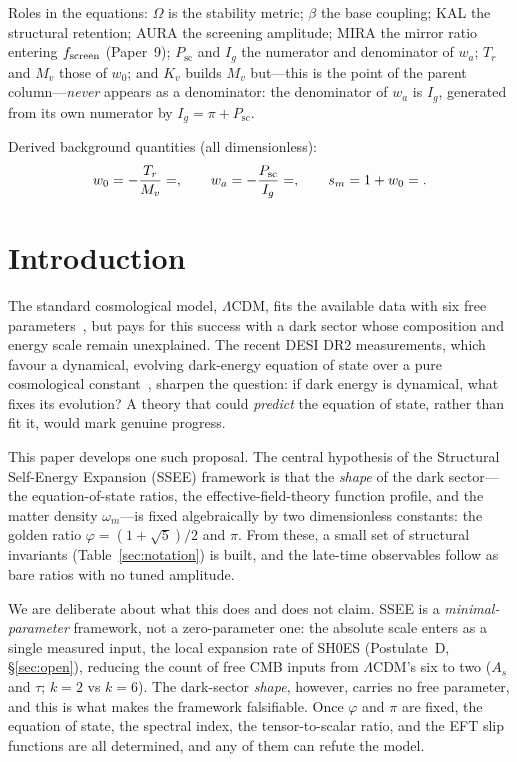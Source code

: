 \documentclass[a4paper,11pt]{article}
\begin{document}
\noindent Roles in the equations: $\Omega$ is the stability metric; $\beta$ the
base coupling; KAL the structural retention; AURA the screening amplitude; MIRA
the mirror ratio entering $f_{\rm screen}$ (Paper~9); $P_{\mathrm{sc}}$ and $I_g$
the numerator and denominator of $w_a$; $T_r$ and $M_v$ those of $w_0$; and $K_v$
builds $M_v$ but---this is the point of the parent column---\emph{never} appears
as a denominator: the denominator of $w_a$ is $I_g$, generated from its own
numerator by $I_g=\pi+P_{\mathrm{sc}}$.

\noindent Derived background quantities (all dimensionless):
\begin{equation*}
w_0=-\frac{T_r}{M_v}=\val{W0_d6},\qquad
w_a=-\frac{P_{\mathrm{sc}}}{I_g}=\val{WA_d6},\qquad
s_m=1+w_0=\val{S_M_d6} .
\end{equation*}


\section{Introduction}
\label{sec:intro}

The standard cosmological model, $\Lambda$CDM, fits the available data with six
free parameters~\citep{Planck2018}, but pays for this success with a dark sector whose composition
and energy scale remain unexplained. The recent DESI DR2 measurements, which
favour a dynamical, evolving dark-energy equation of state over a pure
cosmological constant~\citep{AbdulKarim2025}, sharpen the question: if dark
energy is dynamical, what fixes its evolution? A theory that could
\emph{predict} the equation of state, rather than fit it, would mark genuine
progress.

This paper develops one such proposal. The central hypothesis of the
Structural Self-Energy Expansion (SSEE) framework is that the \emph{shape} of
the dark sector---the equation-of-state ratios, the effective-field-theory function profile, and the matter density $\omega_m$---is fixed algebraically by two dimensionless constants: the golden
ratio $\varphi=(1+\sqrt5)/2$ and $\pi$. From these, a small set of structural
invariants (Table~\ref{sec:notation}) is built, and the late-time observables
follow as bare ratios with no tuned amplitude.

We are deliberate about what this does and does not claim. SSEE is a
\emph{minimal-parameter} framework, not a zero-parameter one: the absolute scale
enters as a single measured input, the local expansion rate of SH0ES (Postulate~D,
\S\ref{sec:open}), reducing the count of free CMB inputs from $\Lambda$CDM's
six to two ($A_s$ and $\tau$; $k=2$ vs $k=6$). The dark-sector \emph{shape}, however, carries no free
parameter, and this is what makes the framework falsifiable. Once $\varphi$ and
$\pi$ are fixed, the equation of state, the spectral index, the
tensor-to-scalar ratio, and the EFT slip functions are all determined, and any
of them can refute the model.
\end{document}
